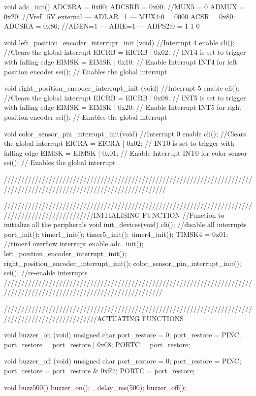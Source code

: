 void adc_init()
{
	ADCSRA = 0x00;
	ADCSRB = 0x00;		//MUX5 = 0
	ADMUX = 0x20;		//Vref=5V external --- ADLAR=1 --- MUX4:0 = 0000
	ACSR = 0x80;
	ADCSRA = 0x86;		//ADEN=1 --- ADIE=1 --- ADPS2:0 = 1 1 0
}


void left_position_encoder_interrupt_init (void) //Interrupt 4 enable
{
	cli(); //Clears the global interrupt
	EICRB = EICRB | 0x02; // INT4 is set to trigger with falling edge
	EIMSK = EIMSK | 0x10; // Enable Interrupt INT4 for left position encoder
	sei();   // Enables the global interrupt
}

void right_position_encoder_interrupt_init (void) //Interrupt 5 enable
{
	cli(); //Clears the global interrupt
	EICRB = EICRB | 0x08; // INT5 is set to trigger with falling edge
	EIMSK = EIMSK | 0x20; // Enable Interrupt INT5 for right position encoder
	sei();   // Enables the global interrupt
}

void color_sensor_pin_interrupt_init(void) //Interrupt 0 enable
{
	cli(); //Clears the global interrupt
	EICRA = EICRA | 0x02; // INT0 is set to trigger with falling edge
	EIMSK = EIMSK | 0x01; // Enable Interrupt INT0 for color sensor
	sei(); // Enables the global interrupt
}

///////////////////////////////////////////////////////////////////////////////////////////////////////////////////////

//////////////////////////////////////////////////////////////////////////////////////////////////INITIALISING FUNCTION
//Function to initialize all the peripherals
void init_devices(void)
{
	cli(); //disable all interrupts
	port_init();
	timer1_init();
	timer5_init();
	timer4_init();
	TIMSK4 = 0x01; //timer4 overflow interrupt enable
	adc_init();
	left_position_encoder_interrupt_init();
	right_position_encoder_interrupt_init();
	color_sensor_pin_interrupt_init();
	sei(); //re-enable interrupts
}
//////////////////////////////////////////////////////////////////////////////////////////////////////////////////////

///////////////////////////////////////////////////////////////////////////////////////////////////ACTUATING FUNCTIONS

void buzzer_on (void)
{
	unsigned char port_restore = 0;
	port_restore = PINC;
	port_restore = port_restore | 0x08;
	PORTC = port_restore;
}

void buzzer_off (void)
{
	unsigned char port_restore = 0;
	port_restore = PINC;
	port_restore = port_restore & 0xF7;
	PORTC = port_restore;
}

void buzz500()
{
	buzzer_on();
	_delay_ms(500);
	buzzer_off();
}


